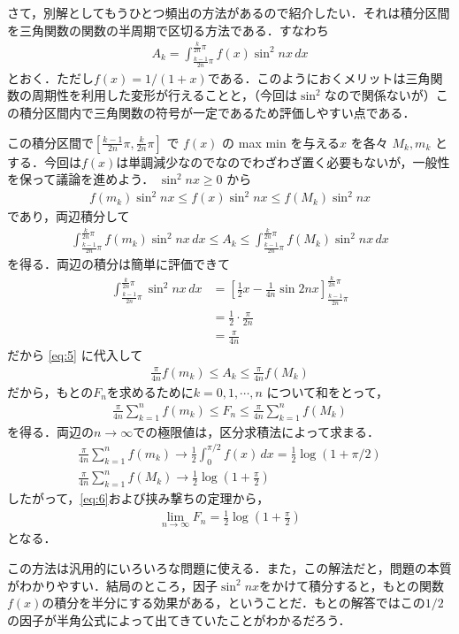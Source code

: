 \documentclass[a4paper,10pt]{ltjsarticle}
\begin{document}
\begin{multicols}{2}
さて，別解としてもうひとつ頻出の方法があるので紹介したい．それは積分区間を三角関数の関数の半周期で区切る方法である．すなわち
\begin{align*}
  A_k = \int_{\frac{k-1}{2n}\pi}^{\frac{k}{2n}\pi} f(x) \sin^2 nx \, dx
\end{align*}
とおく．ただし$f(x)=1/(1+x)$である．このようにおくメリットは三角関数の周期性を利用した変形が行えることと，（今回は$\sin^2$なので関係ないが）この積分区間内で三角関数の符号が一定であるため評価しやすい点である．

この積分区間で$\left[ \frac{k-1}{2n}\pi, \frac{k}{2n}\pi \right]$ で $f(x)$ の max min を与える$x$ を各々 $M_k, m_k$ とする．今回は$f(x)$は単調減少なのでなのでわざわざ置く必要もないが，一般性を保って議論を進めよう．
$\sin^2 nx \ge 0$ から
\begin{align*}
 f(m_k) \sin^2 nx \le f(x) \sin^2 nx \le f(M_k) \sin^2 nx  
\end{align*}
であり，両辺積分して
\begin{align}
 \int_{\frac{k-1}{2n}\pi}^{\frac{k}{2n}\pi} f(m_k) \sin^2 nx \, dx 
 \le A_k 
 \le \int_{\frac{k-1}{2n}\pi}^{\frac{k}{2n}\pi} f(M_k) \sin^2 nx \, dx \label{eq:5}
\end{align}
を得る．両辺の積分は簡単に評価できて
\begin{align*}
 \int_{\frac{k-1}{2n}\pi}^{\frac{k}{2n}\pi} \sin^2 nx \, dx 
 &= \left[ \frac{1}{2}x - \frac{1}{4n}\sin 2nx \right]_{\frac{k-1}{2n}\pi}^{\frac{k}{2n}\pi} \\
 &= \frac{1}{2} \cdot \frac{\pi}{2n} \\
 &= \frac{\pi}{4n}  
\end{align*}
だから \cref{eq:5} に代入して
\begin{align*}
 \frac{\pi}{4n} f(m_k) \le A_k \le \frac{\pi}{4n} f(M_k)  
\end{align*}
だから，もとの$F_n$を求めるために$k=0,1,\cdots,n$ について和をとって，
\begin{align}
 \frac{\pi}{4n} \sum_{k=1}^{n} f(m_k) 
 \le F_n 
 \le \frac{\pi}{4n} \sum_{k=1}^{n} f(M_k) \label{eq:6}
\end{align}
を得る．両辺の$n\to\infty$での極限値は，区分求積法によって求まる．
\begin{align*}
\frac{\pi}{4n} \sum_{k=1}^{n} f(m_k) \longrightarrow \frac{1}{2} \int_0^{\pi/2} f(x) \, dx = \frac{1}{2} \log (1+\pi/2) \\
\frac{\pi}{4n} \sum_{k=1}^{n} f(M_k) \longrightarrow \frac{1}{2} \log \left(1+\frac{\pi}{2}\right)
\end{align*}
したがって，\cref{eq:6}および挟み撃ちの定理から，
\begin{align*}
 \lim_{n\to\infty} F_n = \frac{1}{2}\log \left(1+\frac{\pi}{2}\right)
\end{align*}
となる．

この方法は汎用的にいろいろな問題に使える．また，この解法だと，問題の本質がわかりやすい．結局のところ，因子$\sin^2 nx$をかけて積分すると，もとの関数$f(x)$の積分を半分にする効果がある，ということだ．もとの解答ではこの$1/2$の因子が半角公式によって出てきていたことがわかるだろう．
     \newpage
\end{multicols}
\end{document}
